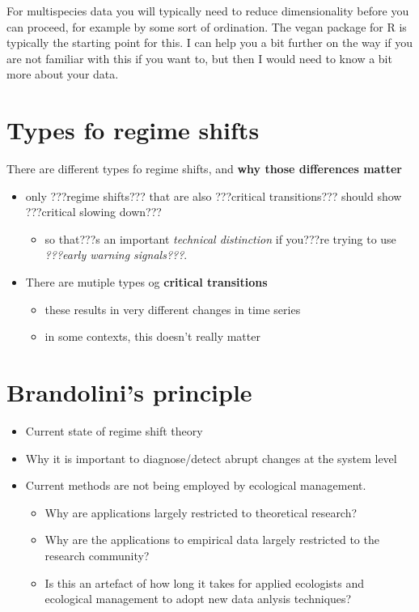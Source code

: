 \documentclass[12pt,twoside,openany]{reedthesis}
\providecommand{\tightlist}{%
  \setlength{\itemsep}{0pt}\setlength{\parskip}{0pt}}
\begin{document}
For multispecies data you will typically need to reduce dimensionality
before you can proceed, for example by some sort of ordination. The
vegan package for R is typically the starting point for this. I can help
you a bit further on the way if you are not familiar with this if you
want to, but then I would need to know a bit more about your data.

\section{Types fo regime shifts}\label{types-fo-regime-shifts}

There are different types fo regime shifts, and \textbf{why those
differences matter}
\begin{itemize}
\tightlist
\item
  only ???regime shifts??? that are also ???critical transitions???
  should show ???critical slowing down???
  \begin{itemize}
  \tightlist
  \item
    so that???s an important \emph{technical distinction} if you???re
    trying to use \emph{???early warning signals???}.\\
  \end{itemize}
\item
  There are mutiple types og \textbf{critical transitions}
  \begin{itemize}
  \tightlist
  \item
    these results in very different changes in time series\\
  \item
    in some contexts, this doesn't really matter
  \end{itemize}
\end{itemize}
\section{Brandolini's principle}\label{brandolinis-principle}
\begin{itemize}
\tightlist
\item
  Current state of regime shift theory
\item
  Why it is important to diagnose/detect abrupt changes at the system
  level
\item
  Current methods are not being employed by ecological management.
  \begin{itemize}
  \tightlist
  \item
    Why are applications largely restricted to theoretical research?
  \item
    Why are the applications to empirical data largely restricted to the
    research community?
  \item
    Is this an artefact of how long it takes for applied ecologists and
    ecological management to adopt new data anlysis techniques?
  \end{itemize}
\end{itemize}
\end{document}
